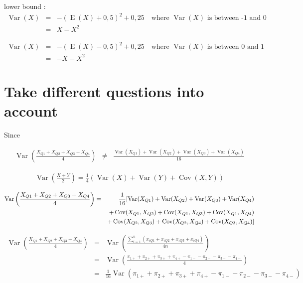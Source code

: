 \documentclass[12pt,a4paper,oneside]{book}
\DeclareMathOperator{\Var}{Var}
\DeclareMathOperator{\Cov}{Cov}
\DeclareMathOperator{\E}{E}
\begin{document}
lower bound : 
\begin{eqnarray}
\Var(X) &=& - (\E(X) + 0,5)^2 + 0,25 \quad \text{where } \Var(X) \text{ is between -1 and 0} \\
    &=& X - X^2 
\end{eqnarray}

\begin{eqnarray}
    \Var(X) &=& - (\E(X) - 0,5)^2 + 0,25 \quad \text{where } \Var(X) \text{ is between 0 and 1} \\
        &=& - X - X^2
\end{eqnarray}
    

\section{Take different questions into account}

Since 

\begin{eqnarray}
    \Var \left(\frac{X_{Q1} + X_{Q2} + X_{Q3} + X_{Q4}}{4} \right) &\neq&
    \frac{\Var(X_{Q1}) + \Var(X_{Q2}) + \Var(X_{Q3}) + \Var(X_{Q4})}{16} \nonumber
\end{eqnarray}


\begin{eqnarray}
    \Var \left(\frac{X+Y}{2} \right) = \frac{1}{4} \left( \Var (X) + \Var(Y) + \Cov (X,Y) \right) 
\end{eqnarray}

\begin{eqnarray}
    \Var \left(\frac{X_{Q1} + X_{Q2} + X_{Q3} + X_{Q4}}{4} \right) &=& \frac{1}{16} \large[ \Var(X_{Q1}) + \Var(X_{Q2}) + \Var(X_{Q3}) + \Var(X_{Q4}) \nonumber \\
    && + \Cov (X_{Q1},X_{Q2}) + \Cov (X_{Q1},X_{Q3}) + \Cov (X_{Q1},X_{Q4}) \nonumber \\
    &&  + \Cov (X_{Q2},X_{Q3}) + \Cov (X_{Q2},X_{Q4}) + \Cov (X_{Q3},X_{Q4}) \large] \nonumber
\end{eqnarray}

\begin{eqnarray}
    \Var \left(\frac{X_{Q1} + X_{Q2} + X_{Q3} + X_{Q4}}{4} \right) 
    &=& \Var \left(\frac{\sum_{i=1}^n \left(x_{i Q1} + x_{i Q2} + x_{i Q3} + x_{i Q4} \right)}{4n} \right) \nonumber \\
    &=& \Var \left(\frac{\pi_{1+} + \pi_{2+} + \pi_{3+} + \pi_{4+} - \pi_{1-} - \pi_{2-} - \pi_{3-} - \pi_{4-} }{4} \right) \nonumber \\
    &=& \frac{1}{16} \Var \left(\pi_{1+} + \pi_{2+} + \pi_{3+} + \pi_{4+} - \pi_{1-} - \pi_{2-} - \pi_{3-} - \pi_{4-} \right) \nonumber \\
\end{eqnarray}
\end{document}
